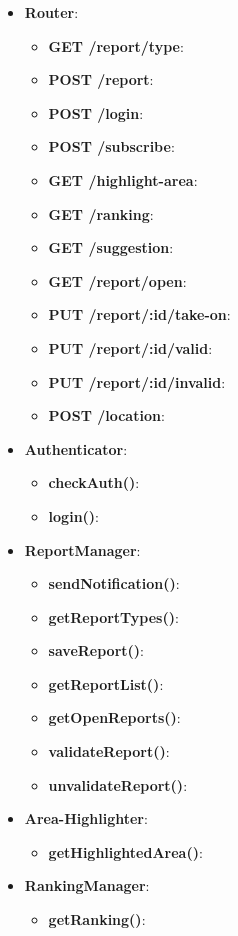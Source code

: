 \documentclass{article}
\begin{document}
\begin{itemize}
	\item \textbf{Router}:
		\begin{itemize}
			\item \textbf{GET /report/type}:
			\item \textbf{POST /report}:
			\item \textbf{POST /login}:
			\item \textbf{POST /subscribe}:
			\item \textbf{GET /highlight-area}:
			\item \textbf{GET /ranking}:
			\item \textbf{GET /suggestion}:
			\item \textbf{GET /report/open}:
			\item \textbf{PUT /report/:id/take-on}:
			\item \textbf{PUT /report/:id/valid}:
			\item \textbf{PUT /report/:id/invalid}:
			\item \textbf{POST /location}:
		\end{itemize}
	\item \textbf{Authenticator}:
		\begin{itemize}
			\item \textbf{checkAuth()}:
			\item \textbf{login()}:
		\end{itemize}
	\item \textbf{ReportManager}:
		\begin{itemize}
			\item \textbf{sendNotification()}:
			\item \textbf{getReportTypes()}:
			\item \textbf{saveReport()}:
			\item \textbf{getReportList()}:
			\item \textbf{getOpenReports()}:
			\item \textbf{validateReport()}:
			\item \textbf{unvalidateReport()}:
		\end{itemize}
	\item \textbf{Area-Highlighter}: 
		\begin{itemize}
			\item \textbf{getHighlightedArea()}:
		\end{itemize}
	\item \textbf{RankingManager}: 
		\begin{itemize}
			\item \textbf{getRanking()}:

\end{itemize}
\end{itemize}
\end{document}
